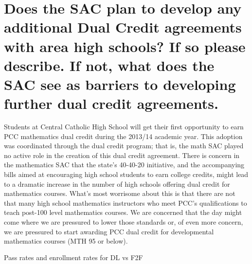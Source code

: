 \section[Future dual credit relationships]{Does the SAC plan to develop any additional Dual Credit agreements with area high schools?  If so please describe.   If not, what does the SAC see as barriers to developing further dual credit agreements. }
Students at Central Catholic High School will get their first opportunity to earn PCC mathematics dual credit during the 2013/14 academic year.  This adoption was coordinated through the dual credit program; that is, the math SAC played no active role in the creation of this dual credit agreement.
There is concern in the mathematics SAC that the state's 40-40-20 initiative, and the accompanying bills aimed at encouraging high school students to earn college credits, might lead to a dramatic increase in the number of high schools offering dual credit for mathematics courses.  What's most worrisome about this is that there are not that many high school mathematics instructors who meet PCC's qualifications to teach post-100 level mathematics courses.  We are concerned that the day might come where we are pressured to lower those standards or, of even more concern, we are pressured to start awarding PCC dual credit for developmental mathematics courses (MTH 95 or below).

\begin{sidewaystable}
	\captionsetup{skip=0pt}
	\centering
	\caption{Pass rates and enrollment rates for DL vs F2F}
	
\end{sidewaystable}

